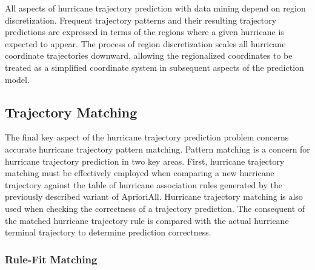 \documentclass[12pt,conference]{IEEEtran}
\begin{document}
All aspects of hurricane trajectory prediction with data mining depend on region discretization. Frequent trajectory patterns and their resulting trajectory predictions are expressed in terms of the regions where a given hurricane is expected to appear. The process of region discretization scales all hurricane coordinate trajectories downward, allowing the regionalized coordinates to be treated as a simplified coordinate system in subsequent aspects of the prediction model.

\subsection{Trajectory Matching}

The final key aspect of the hurricane trajectory prediction problem concerns accurate hurricane trajectory pattern matching. Pattern matching is a concern for hurricane trajectory prediction in two key areas. First, hurricane trajectory matching must be effectively employed when comparing a new hurricane trajectory against the table of hurricane association rules generated by the previously described variant of AprioriAll. Hurricane trajectory matching is also used when checking the correctness of a trajectory prediction. The consequent of the matched hurricane trajectory rule is compared with the actual hurricane terminal trajectory to determine prediction correctness.

\subsubsection{Rule-Fit Matching}
\end{document}
